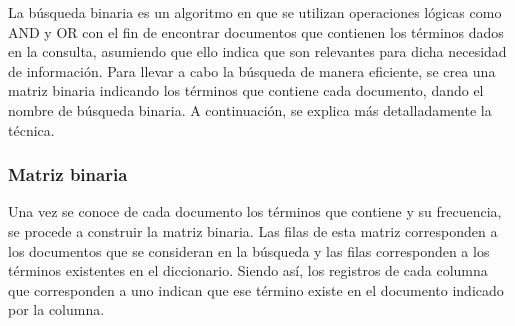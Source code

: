 La búsqueda binaria es un algoritmo en que se utilizan operaciones lógicas como AND y OR con el fin de encontrar documentos que contienen los términos dados en la consulta, asumiendo que ello indica que son relevantes para dicha necesidad de información. Para llevar a cabo la búsqueda de manera eficiente, se crea una matriz binaria indicando los términos que contiene cada documento, dando el nombre de búsqueda binaria. A continuación, se explica más detalladamente la técnica.

\subsubsection{Matriz binaria}
Una vez se conoce de cada documento los términos que contiene y su frecuencia, se procede a construir la matriz binaria. Las filas de esta matriz corresponden a los documentos que se consideran en la búsqueda y las filas corresponden a los términos existentes en el diccionario. Siendo así, los registros de cada columna que corresponden a uno indican que ese término existe en el documento indicado por la columna. \\